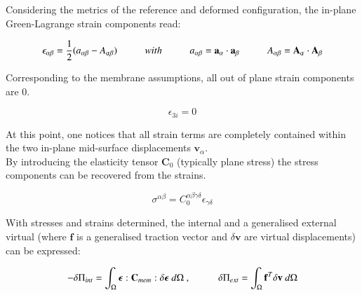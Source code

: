 Considering the metrics of the reference and deformed configuration, the in-plane Green-Lagrange strain components read:

\begin{equation} 
\epsilon_{\alpha\beta} = \frac{1}{2}
(a_{\alpha\beta} - A_{\alpha\beta})
\hspace{10mm}
with
\hspace{10mm}
a_{\alpha\beta} = \mathbf{a}_\alpha \cdot \mathbf{a}_\beta
\hspace{10mm}
A_{\alpha\beta} = \mathbf{A}_\alpha \cdot \mathbf{A}_\beta
\label{eqsmem2}
\end{equation}

Corresponding to the membrane assumptions, all out of plane strain components are 0.

\begin{equation} 
\epsilon_{3i} = 0
\label{eqsmem3}
\end{equation}

At this point, one notices that all strain terms are completely contained within the two in-plane mid-surface displacements $\mathbf{v}_\alpha$. \\

By introducing the elasticity tensor $\mathbf{C}_0$ (typically plane stress) the stress components can be recovered from the strains.

\begin{equation} 
\sigma^{\alpha\beta} = C_0^{\alpha\beta\gamma\delta} \epsilon_{\gamma\delta}
\label{eqsmem4}
\end{equation}

With stresses and strains determined, the internal and a generalised external virtual (where $\mathbf{f}$ is a generalised traction vector and $\delta \mathbf{v}$ are virtual displacements) can be expressed:

\begin{equation} 
-\delta\Pi_{int} = 
\int_\Omega
\boldsymbol{\epsilon}
:
\mathbf{C}_{mem}
:
\delta \boldsymbol{\epsilon}\ 
d \Omega\ ,
\hspace{10mm}
\delta\Pi_{ext} = \int_\Omega
\mathbf{f}^T
\delta  \mathbf{v}\ 
d \Omega
\label{eqsmem5}
\end{equation}

%


